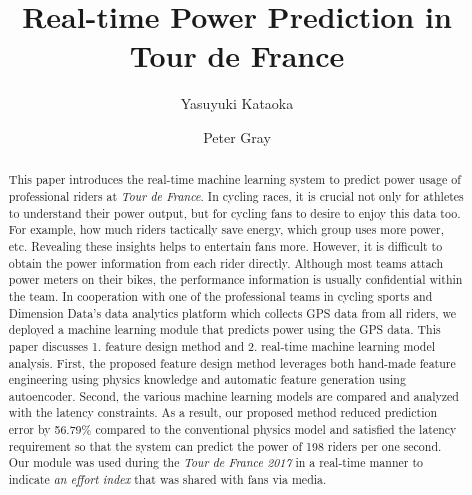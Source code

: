 \documentclass[runningheads]{llncs}
\begin{document}
%
\title{Real-time Power Prediction in Tour de France}

%
%
\author{
Yasuyuki Kataoka \and Peter Gray}
%
%
%
\maketitle              %
%
\begin{abstract}
This paper introduces the real-time machine learning system to predict power usage of professional riders at {\it{Tour de France}}. In cycling races, it is crucial not only for athletes to understand their power output, but for cycling fans to desire to enjoy this data too. For example, how much riders tactically save energy, which group uses more power, etc. Revealing these insights helps to entertain fans more. However, it is difficult to obtain the power information from each rider directly. Although most teams attach power meters on their bikes, the performance information is usually confidential within the team.  In cooperation with one of the professional teams in cycling sports and Dimension Data's data analytics platform which collects GPS data from all riders, we deployed a machine learning module that predicts power
using the GPS data. 
This paper discusses 1. feature design method and 2. real-time machine learning model analysis. First, the proposed feature design method leverages both hand-made feature engineering using physics knowledge and automatic feature generation using autoencoder. Second, the various machine learning models are compared and analyzed with the latency constraints.  As a result, our proposed method reduced prediction error by 56.79\% compared to the conventional physics model and satisfied the latency requirement so that the system can predict the power of 198 riders per one second. Our module was used during the {\it{Tour de France 2017}} in a real-time manner to indicate {\it{an effort index}} that was shared with fans via media.



\end{abstract}
%
%
%
\end{document}
